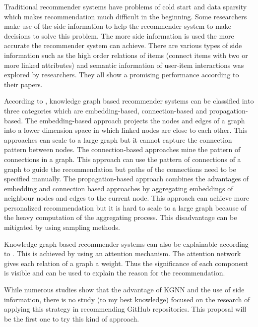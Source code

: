 \documentclass[11pt,twoside]{report}
\begin{document}
Traditional recommender systems have problems of cold start and data sparsity \cite{mansur_review_nodate, wu_graph_2020, zhang_knowledge_2020} which makes recommendation much difficult in the beginning. Some researchers make use of the side information to help the recommender system to make decisions to solve this problem. The more side information is used the more accurate the recommender system can achieve. There are various types of side information such as the high order relations of items (connect items with two or more linked attributes) \cite{wang_kgat_2019} and semantic information of user-item interactions \cite{wang_knowledge_2019} was explored by researchers. They all show a promising performance according to their papers.

According to \cite{guo_survey_2020}, knowledge graph based recommender systems can be classified into three categories which are embedding-based, connection-based and propagation-based. The embedding-based approach projects the nodes and edges of a graph into a lower dimension space in which linked nodes are close to each other. This approaches can scale to a large graph but it cannot capture the connection pattern between nodes. The connection-based approaches mine the pattern of connections in a graph. This approach can use the pattern of connections of a graph to guide the recommendation but paths of the connections need to be specified manually. The propagation-based approach combines the advantages of embedding and connection based approaches by aggregating embeddings of neighbour nodes and edges to the current node. This approach can achieve more personalized recommendation but it is hard to scale to a large graph because of the heavy computation of the aggregating process. This disadvantage can be mitigated by using sampling methods.

Knowledge graph based recommender systems can also be explainable according to \cite{guo_survey_2020}. This is achieved by using an attention mechanism. The attention network gives each relation of a graph a weight. Thus the significance of each component is visible and can be used to explain the reason for the recommendation.

While numerous studies show that the advantage of KGNN and the use of side information, there is no study (to my best knowledge) focused on the research of applying this strategy in recommending GitHub repositories. This proposal will be the first one to try this kind of approach.

\end{document}
